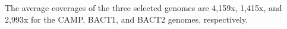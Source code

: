 The average coverages of the three selected genomes are 4,159x, 1,415x, and 2,993x for the CAMP, BACT1, and BACT2 genomes, respectively.\endinput